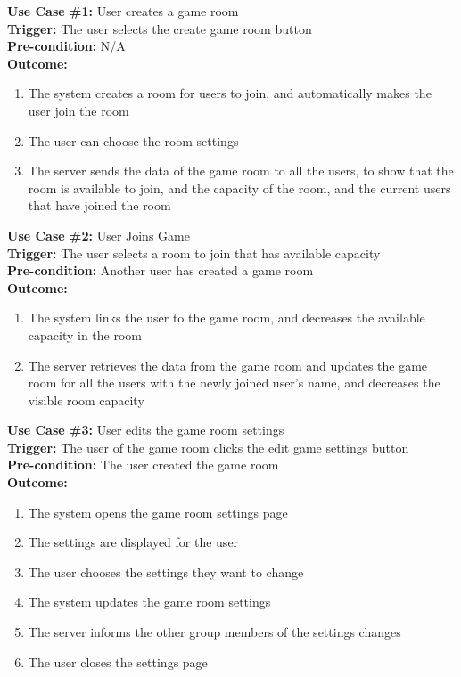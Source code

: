 \documentclass[12pt]{article}
\begin{document}
\textbf{Use Case \#1:} User creates a game room\\
\textbf{Trigger:} The user selects the create game room button\\
\textbf{Pre-condition:} N/A\\
\textbf{Outcome:}
\begin{enumerate}
	\item The system creates a room for users to join, and automatically makes the user join the room
    \item The user can choose the room settings
	\item The server sends the data of the game room to all the users, to show that the room is available to join, and the capacity of the room, and the current users that have joined the room
\end{enumerate}
\textbf{Use Case \#2:} User Joins Game\\
\textbf{Trigger:} The user selects a room to join that has available capacity\\
\textbf{Pre-condition:} Another user has created a game room\\
\textbf{Outcome:}
\begin{enumerate}
	\item The system links the user to the game room, and decreases the available capacity in the room
    \item The server retrieves the data from the game room and updates the game room for all the users with the newly joined user's name, and decreases the visible room capacity
\end{enumerate}
\textbf{Use Case \#3:} User edits the game room settings\\
\textbf{Trigger:} The user of the game room clicks the edit game settings button\\
\textbf{Pre-condition:} The user created the game room\\
\textbf{Outcome:}
\begin{enumerate}
	\item The system opens the game room settings page
    \item The settings are displayed for the user
    \item The user chooses the settings they want to change
    \item The system updates the game room settings
    \item The server informs the other group members of the settings changes
    \item The user closes the settings page
\end{enumerate}
\end{document}
